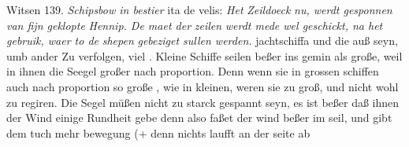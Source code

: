 \pstart 
[158 v\textsuperscript{o}] Witsen\protect{}  139. \textit{Schipsbow in bestier} ita de velis\protect{}: \textit{Het }\textit{Zeildoeck}\protect{}\textit{ nu, werdt gesponnen van fijn geklopte }\textit{Hennip}\protect{}\textit{. De maet der }\textit{zeilen}\protect{}\textit{ werdt mede wel geschickt, na het gebruik, waer to de }\textit{shepen}\protect{}\textit{ gebeziget sullen werden.}  jachtschiffa\protect{} und die auß seyn, umb ander Zu verfolgen, viel . Kleine Schiffe\protect{} seilen beßer ins gemin als große, weil in ihnen die Seegel\protect{} großer nach proportion. Denn wenn sie in grossen schiffen\protect{} auch nach proportion so große , wie in kleinen, weren sie zu groß, und nicht wohl zu regiren. Die Segel\protect{} m\"{u}ßen nicht zu starck gespannt seyn,  es ist beßer daß ihnen der Wind einige Rundheit gebe denn also faßet der wind beßer im seil, und gibt dem tuch mehr bewegung (+ denn nichts laufft an der seite ab 
